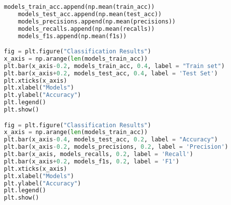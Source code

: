 \begin{lstlisting}[language=Python]
    models_train_acc.append(np.mean(train_acc))
    models_test_acc.append(np.mean(test_acc))
    models_precisions.append(np.mean(precisions))
    models_recalls.append(np.mean(recalls))
    models_f1s.append(np.mean(f1s))

fig = plt.figure("Classification Results")
x_axis = np.arange(len(models_train_acc))
plt.bar(x_axis-0.2, models_train_acc, 0.4, label = "Train set")
plt.bar(x_axis+0.2, models_test_acc, 0.4, label = 'Test Set')
plt.xticks(x_axis)
plt.xlabel("Models")
plt.ylabel("Accuracy")
plt.legend()
plt.show()

fig = plt.figure("Classification Results")
x_axis = np.arange(len(models_train_acc))
plt.bar(x_axis-0.4, models_test_acc, 0.2, label = "Accuracy")
plt.bar(x_axis-0.2, models_precisions, 0.2, label = 'Precision')
plt.bar(x_axis, models_recalls, 0.2, label = 'Recall')
plt.bar(x_axis+0.2, models_f1s, 0.2, label = 'F1')
plt.xticks(x_axis)
plt.xlabel("Models")
plt.ylabel("Accuracy")
plt.legend()
plt.show()
\end{lstlisting}

